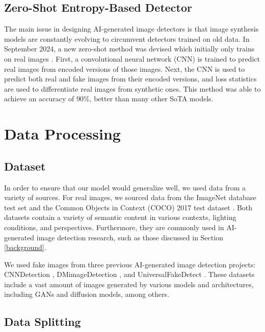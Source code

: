 \documentclass{article} %
\begin{document}
\subsection{Zero-Shot Entropy-Based Detector}
\label{ZED}

The main issue in designing AI-generated image detectors is that image synthesis models are constantly evolving to circumvent detectors trained on old data. In September 2024, a new zero-shot method was devised which initially only trains on real images \citep{cozzolino2024zeroshotdetectionaigeneratedimages}. First, a convolutional neural network (CNN) is trained to predict real images from encoded versions of those images. Next, the CNN is used to predict both real and fake images from their encoded versions, and loss statistics are used to differentiate real images from synthetic ones. This method was able to achieve an accuracy of 90\%, better than many other SoTA models.

\section{Data Processing}

\subsection{Dataset}

In order to ensure that our model would generalize well, we used data from a variety of sources. For real images, we sourced data from the ImageNet database test set \citep{5206848} and the Common Objects in Context (COCO) 2017 test dataset \citep{lin2015microsoft}. Both datasets contain a variety of semantic content in various contexts, lighting conditions, and perspectives. Furthermore, they are commonly used in AI-generated image detection research, such as those discussed in Section \ref{background}.

We used fake images from three previous AI-generated image detection projects: CNNDetection
\citep{wang2020cnngeneratedimagessurprisinglyeasy}, DMimageDetection \citep{corvi2022detectionsyntheticimagesgenerated}, and UniversalFakeDetect
\citep{ojha2024universalfakeimagedetectors}. These datasets include a vast amount of images generated by various models and architectures, including GANs and diffusion models, among others.

\subsection{Data Splitting}
\end{document}
